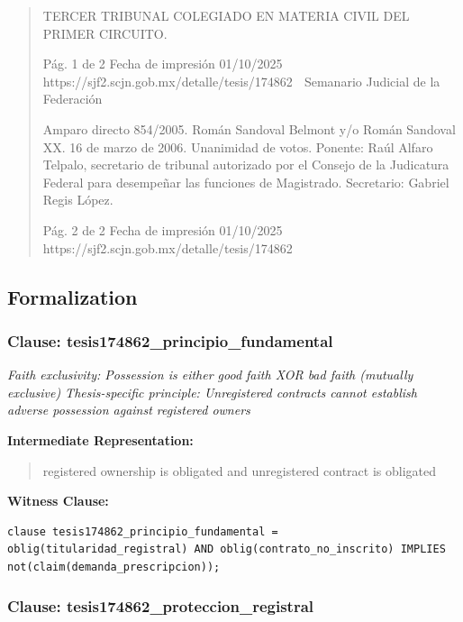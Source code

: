 \documentclass[11pt,a4paper]{article}
\begin{document}
\begin{quote}
TERCER TRIBUNAL COLEGIADO EN MATERIA CIVIL DEL PRIMER CIRCUITO.




                                             Pág. 1 de 2             Fecha de impresión 01/10/2025
  https://sjf2.scjn.gob.mx/detalle/tesis/174862
                                                  Semanario Judicial de la Federación

Amparo directo 854/2005. Román Sandoval Belmont y/o Román Sandoval XX. 16 de marzo de
2006. Unanimidad de votos. Ponente: Raúl Alfaro Telpalo, secretario de tribunal autorizado por el
Consejo de la Judicatura Federal para desempeñar las funciones de Magistrado. Secretario: Gabriel
Regis López.




                                             Pág. 2 de 2          Fecha de impresión 01/10/2025
  https://sjf2.scjn.gob.mx/detalle/tesis/174862

\end{quote}

\subsection{Formalization}

\subsubsection{Clause: tesis174862\_principio\_fundamental}

\textit{Faith exclusivity: Possession is either good faith XOR bad faith (mutually exclusive) Thesis-specific principle: Unregistered contracts cannot establish adverse possession against registered owners}

\textbf{Intermediate Representation:}

\begin{quote}
registered ownership is obligated and unregistered contract is obligated
\end{quote}

\textbf{Witness Clause:}

\begin{lstlisting}[style=witnessstyle, language=Witness]
clause tesis174862_principio_fundamental = oblig(titularidad_registral) AND oblig(contrato_no_inscrito) IMPLIES not(claim(demanda_prescripcion));
\end{lstlisting}

\subsubsection{Clause: tesis174862\_proteccion\_registral}
\end{document}
